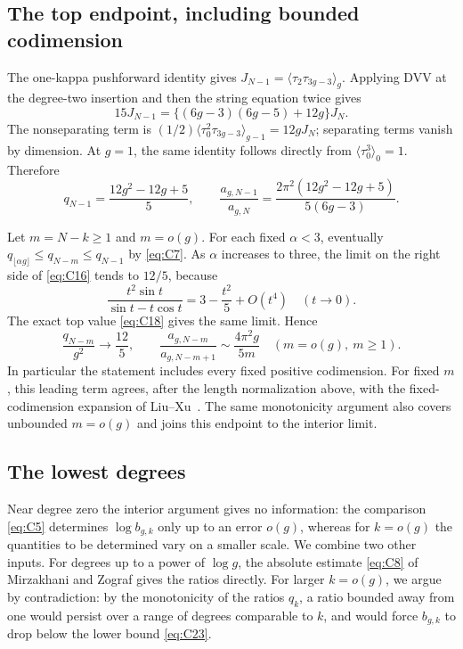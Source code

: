 \subsection{The top endpoint, including bounded codimension}\label{the-top-endpoint-including-bounded-codimension}

The one-kappa pushforward identity gives
\(J_{N-1}=\langle\tau_2\tau_{3g-3}\rangle_g\). Applying DVV at the
degree-two insertion and then the string equation twice gives \[
 15J_{N-1}=
 \{(6g-3)(6g-5)+12g\}J_N.
\] The nonseparating term is
\((1/2)\langle\tau_0^2\tau_{3g-3}\rangle_{g-1}=12gJ_N\); separating
terms vanish by dimension. At \(g=1\), the same identity follows
directly from \(\langle\tau_0^3\rangle_0=1\). Therefore \begin{equation}
q_{N-1}=\frac{12g^2-12g+5}{5},
 \qquad
 \frac{a_{g,N-1}}{a_{g,N}}
 =\frac{2\pi^2(12g^2-12g+5)}{5(6g-3)}.
 \label{eq:C18}
\end{equation}

Let \(m=N-k\ge1\) and \(m=o(g)\). For each fixed \(\alpha<3\),
eventually \(q_{\lfloor\alpha g\rfloor}\le q_{N-m}\le q_{N-1}\) by \eqref{eq:C7}.
As \(\alpha\) increases to three, the limit on the right side of \eqref{eq:C16}
tends to \(12/5\), because \begin{equation}
\frac{t^2\sin t}{\sin t-t\cos t}
       =3-\frac{t^2}{5}+O(t^4)\quad(t\to0).
 \label{eq:C19}
\end{equation} The exact top value \eqref{eq:C18} gives the same limit. Hence \begin{equation}
\frac{q_{N-m}}{g^2}\longrightarrow\frac{12}{5},
 \qquad
 \frac{a_{g,N-m}}{a_{g,N-m+1}}
       \sim\frac{4\pi^2g}{5m}\quad(m=o(g),\ m\ge1).
 \label{eq:C20}
\end{equation} In particular the statement includes every fixed positive
codimension.
For fixed $m$, this leading term agrees, after the length normalization
above, with the fixed-codimension expansion of
Liu--Xu~\cite[Theorem~1.2]{LX}. The same monotonicity argument also covers
unbounded $m=o(g)$ and joins this endpoint to the interior limit.

\subsection{The lowest degrees}\label{the-bottom-endpoint-without-a-relative-error-assumption}

Near degree zero the interior argument gives no information: the
comparison \eqref{eq:C5} determines \(\log b_{g,k}\) only up to an error
\(o(g)\), whereas for \(k=o(g)\) the quantities to be determined vary on a
smaller scale. We combine two other inputs. For degrees up to a power of \(\log g\), the absolute estimate
\eqref{eq:C8} of Mirzakhani and Zograf gives the ratios directly. For
larger \(k=o(g)\), we argue by contradiction: by the monotonicity of the
ratios \(q_k\), a ratio bounded away from one would persist over a range
of degrees comparable to \(k\), and would force \(b_{g,k}\) to drop below
the lower bound \eqref{eq:C23}.

